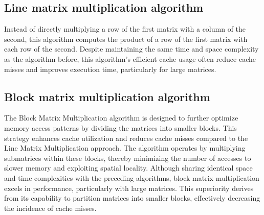 \subsection{Line matrix multiplication algorithm}

Instead of directly multiplying a row of the
first matrix with a column of the second, this algorithm
computes the product of a row of the first
matrix with each row of the second. Despite maintaining the same time and space complexity as the algorithm before, this algorithm's
efficient cache usage often reduce cache misses and improves
execution time, particularly for large matrices.


\subsection{Block matrix multiplication algorithm}

The Block Matrix Multiplication algorithm is designed
to further optimize memory access patterns by dividing
the matrices into smaller blocks. This strategy enhances
cache utilization and reduces cache misses compared to the
Line Matrix Multiplication approach. The algorithm operates by
multiplying submatrices
within these blocks, thereby minimizing the number of accesses to slower memory
and exploiting spatial locality. Although
sharing identical space and time complexities with the preceding
algorithms, block matrix multiplication excels in performance,
particularly with large matrices. This superiority derives from its
capability to partition matrices into smaller blocks, effectively
decreasing the incidence of cache misses.